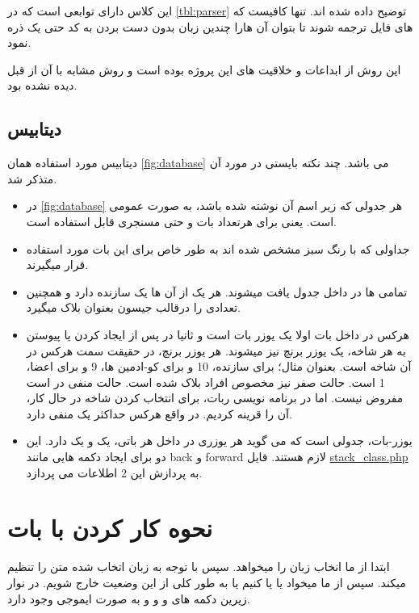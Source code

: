 \documentclass[oneside]{article}
\begin{document}
این کلاس دارای توابعی است که در \autoref{tbl:parser} توضیح داده شده اند.
تنها کافیست که  های فایل  ترجمه شوند تا بتوان آن هارا چندین زبان بدون دست بردن به کد حتی یک ذره نمود. 

این روش از ابداعات و خلاقیت های این پروژه بوده است و روش مشابه با آن از قبل دیده نشده بود.


\subsection{دیتابیس}
دیتابیس مورد استفاده همان \autoref{fig:database} می باشد. چند نکته بایستی در مورد آن متذکر شد.
\begin{itemize}
\item
 در \autoref{fig:database} هر جدولی که زیر اسم آن  نوشته شده باشد، به صورت عمومی است. یعنی برای هرتعداد بات و حتی مسنجری قابل استفاده است.
\item
 جداولی که با رنگ سبز مشخص شده اند به طور خاص برای این بات مورد استفاده قرار میگیرند.
\item
تمامی  ها در داخل جدول  یافت میشوند. هر یک از آن ها یک سازنده دارد و همچنین تعدادی را درقالب جیسون بعنوان بلاک میگیرد.
\item
هرکس در داخل بات اولا یک یوزر بات است و ثانیا در پس از ایجاد کردن یا پیوستن به هر شاخه، یک یوزر برنچ نیز میشوند.
هر یوزر برنچ، در حقیقت سمت هرکس در آن شاخه است. بعنوان مثال؛ برای سازنده، 10 و برای کو-ادمین ها، 9 و برای اعضا، 1 است.
حالت صفر نیز مخصوص افراد بلاک شده است. حالت منفی در است مفروض نیست. اما در برنامه نویسی ربات، برای انتخاب کردن شاخه در حال کار،  آن را قرینه کردیم. در واقع هرکس حداکثر یک  منفی دارد.
\item
یوزر-بات، جدولی است که می گوید هر یوزری در داخل هر باتی، یک  و یک  دارد.
این دو برای ایجاد دکمه هایی مانند back و forward لازم هستند.
فایل
\href{ftp://telegr28:telegram123456@telegramadminpro.ml/public_html/bot/stack_class.php}{stack\_class.php}
به پردازش این 2 اطلاعات می پردازد.



\end{itemize}


\section{نحوه کار کردن با بات}
ابتدا از ما انخاب زبان را میخواهد. سپس با توجه به زبان اتخاب شده متن را تنظیم میکند. سپس از ما میخواد یا  یا  کنیم یا به طور کلی از این وضعیت خارج شویم.
در نوار زیرین دکمه های  و  و  و  به صورت ایموجی وجود دارد.
\end{document}
